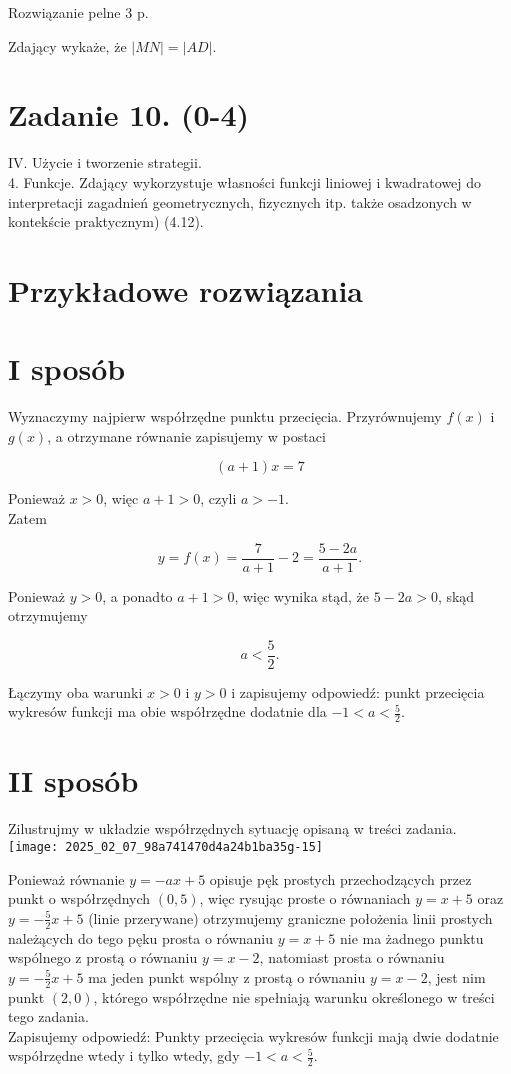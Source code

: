 \documentclass[10pt]{article}
\begin{document}
Rozwiązanie pelne 3 p.

Zdający wykaże, że $|M N|=|A D|$.

\section*{Zadanie 10. (0-4)}
IV. Użycie i tworzenie strategii.\\
4. Funkcje. Zdający wykorzystuje własności funkcji liniowej i kwadratowej do interpretacji zagadnień geometrycznych, fizycznych itp. także osadzonych w kontekście praktycznym) (4.12).

\section*{Przykładowe rozwiązania}
\section*{I sposób}
Wyznaczymy najpierw współrzędne punktu przecięcia. Przyrównujemy $f(x)$ i $g(x)$, a otrzymane równanie zapisujemy w postaci

$$
(a+1) x=7
$$

Ponieważ $x>0$, więc $a+1>0$, czyli $a>-1$.\\
Zatem

$$
y=f(x)=\frac{7}{a+1}-2=\frac{5-2 a}{a+1} .
$$

Ponieważ $y>0$, a ponadto $a+1>0$, więc wynika stąd, że $5-2 a>0$, skąd otrzymujemy

$$
a<\frac{5}{2} .
$$

Łączymy oba warunki $x>0$ i $y>0$ i zapisujemy odpowiedź: punkt przecięcia wykresów funkcji ma obie współrzędne dodatnie dla $-1<a<\frac{5}{2}$.

\section*{II sposób}
Zilustrujmy w układzie współrzędnych sytuację opisaną w treści zadania.\\
\texttt{[image: 2025\_02\_07\_98a741470d4a24b1ba35g-15]}

Ponieważ równanie $y=-a x+5$ opisuje pęk prostych przechodzących przez punkt o współrzędnych $(0,5)$, więc rysując proste o równaniach $y=x+5$ oraz $y=-\frac{5}{2} x+5$ (linie przerywane) otrzymujemy graniczne położenia linii prostych należących do tego pęku prosta o równaniu $y=x+5$ nie ma żadnego punktu wspólnego z prostą o równaniu $y=x-2$, natomiast prosta o równaniu $y=-\frac{5}{2} x+5$ ma jeden punkt wspólny z prostą o równaniu $y=x-2$, jest nim punkt $(2,0)$, którego współrzędne nie spełniają warunku określonego w treści tego zadania.\\
Zapisujemy odpowiedź: Punkty przecięcia wykresów funkcji mają dwie dodatnie współrzędne wtedy i tylko wtedy, gdy $-1<a<\frac{5}{2}$.
\end{document}
